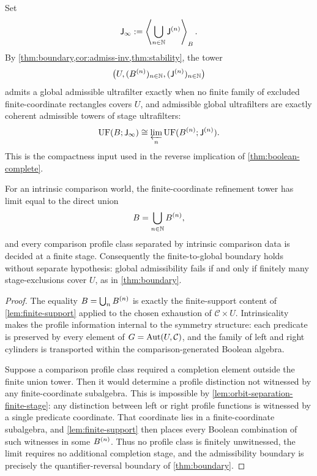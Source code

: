 Set
\[
	\mathsf J_\infty:=\left\langle \bigcup_{n\in\mathbb N}\mathsf J^{(n)}\right\rangle_{B}.
\]
By \cref{thm:boundary,cor:admiss-inv,thm:stability}, the tower
\[
	\bigl(U,(B^{(n)})_{n\in\mathbb N},(\mathsf J^{(n)})_{n\in\mathbb N}\bigr)
\]
admits a global admissible ultrafilter exactly when no finite family of
excluded finite-coordinate rectangles covers \(U\), and admissible
global ultrafilters are exactly coherent admissible towers of stage
ultrafilters:
\[
	\operatorname{UF}(B;\mathsf J_\infty)
	\cong
	\varprojlim_n \operatorname{UF}(B^{(n)};\mathsf J^{(n)}).
\]
This is the compactness input used in the reverse implication of
\cref{thm:boolean-complete}.
\begin{theorem}
	\label{thm:compactness-from-intrinsicality}
	For an intrinsic comparison world,
	the finite-coordinate refinement tower has limit equal to the direct
	union
	\[
		B=\bigcup_{n\in\mathbb N}B^{(n)},
	\]
	and every comparison profile class separated by intrinsic comparison data
	is decided at a finite stage. Consequently the finite-to-global boundary
	holds without separate hypothesis: global admissibility fails if and
	only if finitely many stage-exclusions cover \(U\), as in
	\cref{thm:boundary}.
\end{theorem}
\begin{proof}
	The equality \(B=\bigcup_nB^{(n)}\) is exactly the finite-support
	content of \cref{lem:finite-support} applied to the chosen exhaustion of
	\(\mathcal C\times U\). Intrinsicality makes the profile information
	internal to the symmetry structure: each predicate is preserved by every
	element of \(G=\operatorname{Aut}(U,\mathcal C)\), and the family of left and right
	cylinders is transported within the comparison-generated Boolean algebra.

	Suppose a comparison profile class required a completion element outside
	the finite union tower. Then it would determine a profile distinction not
	witnessed by any finite-coordinate subalgebra. This is impossible by
	\cref{lem:orbit-separation-finite-stage}: any distinction between left or
	right profile functions is witnessed by a single predicate coordinate.
	That coordinate lies in a finite-coordinate subalgebra, and
	\cref{lem:finite-support} then places every Boolean combination of such
	witnesses in some \(B^{(n)}\). Thus no profile class is finitely
	unwitnessed, the limit requires no additional completion stage, and the
	admissibility boundary is precisely the quantifier-reversal boundary of
	\cref{thm:boundary}.
\end{proof}
